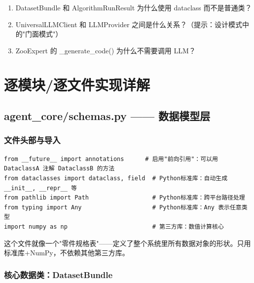 \documentclass[11pt,a4paper]{ctexbook}
\begin{document}
\begin{reviewbox}
    \begin{enumerate}
        \item DatasetBundle 和 AlgorithmRunResult 为什么使用 dataclass 而不是普通类？
        \item UniversalLLMClient 和 LLMProvider 之间是什么关系？（提示：设计模式中的"门面模式"）
        \item ZooExpert 的 \_generate\_code() 为什么不需要调用 LLM？
    \end{enumerate}
\end{reviewbox}

\chapter{逐模块/逐文件实现详解}

\section{agent\_core/schemas.py —— 数据模型层}

\subsection{文件头部与导入}

\begin{verbatim}
from __future__ import annotations      # 启用"前向引用"：可以用 DataclassA 注解 DataclassB 的方法
from dataclasses import dataclass, field  # Python标准库：自动生成 __init__, __repr__ 等
from pathlib import Path                  # Python标准库：跨平台路径处理
from typing import Any                    # Python标准库：Any 表示任意类型
import numpy as np                        # 第三方库：数值计算核心
\end{verbatim}

\begin{plainbox}
    这个文件就像一个"零件规格表"——定义了整个系统里所有数据对象的形状。只用标准库+NumPy，不依赖其他第三方库。
\end{plainbox}

\subsection{核心数据类：DatasetBundle}
\end{document}
